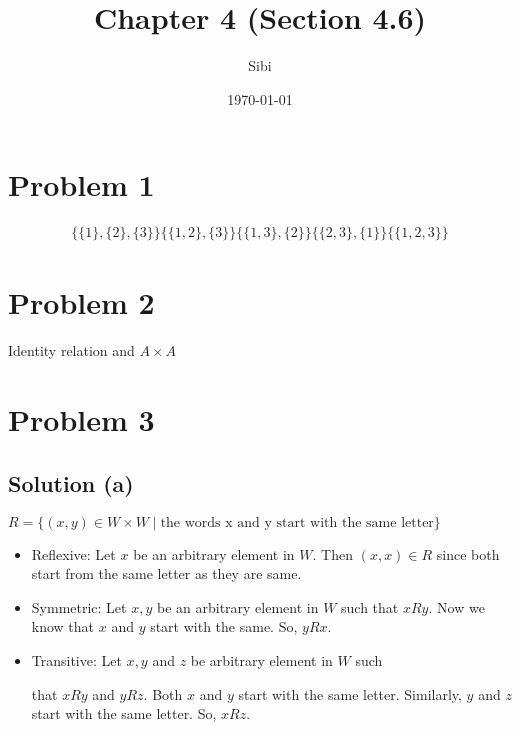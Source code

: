 \documentclass{article}
\begin{document}
\title{Chapter 4 (Section 4.6)}
\author{Sibi}
\date{\today}
\maketitle

\DeclarePairedDelimiter\abs{\lvert}{\rvert}%
\DeclarePairedDelimiter\norm{\lVert}{\rVert}%

\makeatletter
\let\oldabs\abs
\def\abs{\@ifstar{\oldabs}{\oldabs*}}
%
\let\oldnorm\norm
\def\norm{\@ifstar{\oldnorm}{\oldnorm*}}
\makeatother
\newpage

\section{Problem 1}

\begin{align*}
  \{\{1\},\{2\},\{3\}\}
  \{\{1,2\},\{3\}\}
  \{\{1,3\},\{2\}\}
  \{\{2,3\},\{1\}\}
  \{\{1,2,3\}\}
\end{align*}

\section{Problem 2}

Identity relation and $A \times A$

\section{Problem 3}

\subsection{Solution (a)}
$R = \{(x,y) \in W \times W \mid \text{the words x and y start with the same
letter} \}$

\begin{itemize}
\item Reflexive: Let $x$ be an arbitrary element in $W$. Then $(x,x)
  \in R$ since both start from the same letter as they are same.
\item Symmetric: Let $x,y$ be an arbitrary element in $W$ such that
  $xRy$. Now we know that $x$ and $y$ start with the same. So, $yRx$.
\item Transitive: Let $x,y$ and $z$ be arbitrary element in $W$ such

  that $xRy$ and $yRz$. Both $x$ and $y$ start with the same letter.
  Similarly, $y$ and $z$ start with the same letter. So, $xRz$.
\end{itemize}
\end{document}
